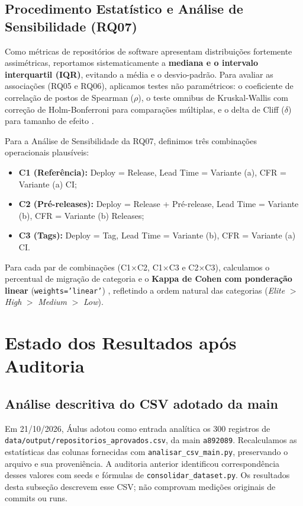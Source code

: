 \documentclass[12pt]{article}
\begin{document}
\subsection{Procedimento Estatístico e Análise de Sensibilidade (RQ07)}
Como métricas de repositórios de software apresentam distribuições fortemente assimétricas, reportamos sistematicamente a \textbf{mediana e o intervalo interquartil (IQR)}, evitando a média e o desvio-padrão. Para avaliar as associações (RQ05 e RQ06), aplicamos testes não paramétricos: o coeficiente de correlação de postos de Spearman ($\rho$), o teste omnibus de Kruskal-Wallis com correção de Holm-Bonferroni para comparações múltiplas, e o delta de Cliff ($\delta$) para tamanho de efeito \cite{romano2006appropriate}.

Para a Análise de Sensibilidade da RQ07, definimos três combinações operacionais plausíveis:
\begin{itemize}
    \item \textbf{C1 (Referência):} Deploy = Release, Lead Time = Variante (a), CFR = Variante (a) CI;
    \item \textbf{C2 (Pré-releases):} Deploy = Release + Pré-release, Lead Time = Variante (b), CFR = Variante (b) Releases;
    \item \textbf{C3 (Tags):} Deploy = Tag, Lead Time = Variante (b), CFR = Variante (a) CI.
\end{itemize}
Para cada par de combinações (C1$\times$C2, C1$\times$C3 e C2$\times$C3), calculamos o percentual de migração de categoria e o \textbf{Kappa de Cohen com ponderação linear} (\texttt{weights='linear'}) \cite{landis1977measurement}, refletindo a ordem natural das categorias (\textit{Elite} $>$ \textit{High} $>$ \textit{Medium} $>$ \textit{Low}).

\section{Estado dos Resultados após Auditoria}

\subsection{Análise descritiva do CSV adotado da main}
Em 21/10/2026, Áulus adotou como entrada analítica os 300 registros de
\texttt{data/output/repositorios\_aprovados.csv}, da main \texttt{a892089}.
Recalculamos as estatísticas das colunas fornecidas com
\texttt{analisar\_csv\_main.py}, preservando o arquivo e sua proveniência.
A auditoria anterior identificou correspondência desses valores com seeds e
fórmulas de \texttt{consolidar\_dataset.py}. Os resultados desta subseção
descrevem esse CSV; não comprovam medições originais de commits ou runs.
\end{document}
